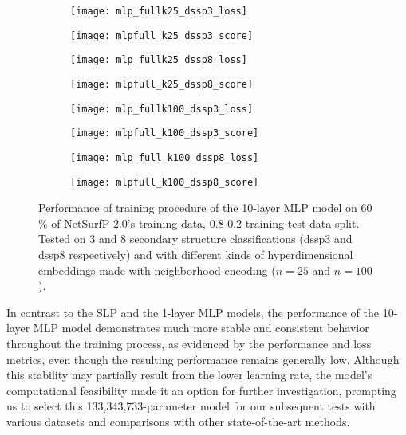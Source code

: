 \begin{figure}[htbp]
    \centering
    \begin{subfigure}{0.48\textwidth}
        \texttt{[image: mlp\_fullk25\_dssp3\_loss]}
        \label{fig:subefig}
    \end{subfigure}
    \hfill
    \begin{subfigure}{0.48\textwidth}
        \texttt{[image: mlpfull\_k25\_dssp3\_score]}
        \label{fig:subefi}
    \end{subfigure}
    
    \begin{subfigure}{0.48\textwidth}
        \texttt{[image: mlp\_fullk25\_dssp8\_loss]}
        \label{fig:subef}
    \end{subfigure}
    \hfill
    \begin{subfigure}{0.48\textwidth}
        \texttt{[image: mlpfull\_k25\_dssp8\_score]}
        \label{fig:sube}
    \end{subfigure}
    
    \begin{subfigure}{0.48\textwidth}
        \texttt{[image: mlp\_fullk100\_dssp3\_loss]}
        \label{fig:sue}
    \end{subfigure}
    \hfill
    \begin{subfigure}{0.48\textwidth}
        \texttt{[image: mlpfull\_k100\_dssp3\_score]}
        \label{fig:se}
    \end{subfigure}
    
    \begin{subfigure}{0.48\textwidth}
        \texttt{[image: mlp\_full\_k100\_dssp8\_loss]}
        \label{fig:sge}
    \end{subfigure}
    \hfill
    \begin{subfigure}{0.48\textwidth}
        \texttt{[image: mlpfull\_k100\_dssp8\_score]}
        \label{fig:she}
    \end{subfigure}
    \caption{Performance of training procedure of the 10-layer MLP model on 60 \% of NetSurfP 2.0's training data, 0.8-0.2 training-test data split. Tested on 3 and 8 secondary structure classifications (dssp3 and dssp8 respectively) and with different kinds of hyperdimensional embeddings made with neighborhood-encoding ($n = 25$ and $n=100$).}
    \label{fig:main8e}
  \end{figure}

In contrast to the SLP and the 1-layer MLP models, the performance of the 10-layer MLP model demonstrates much more stable and consistent behavior throughout the training process, as evidenced by the performance and loss metrics, even though the resulting performance remains generally low. Although this stability may partially result from the lower learning rate, the model's computational feasibility made it an option for further investigation, prompting us to select this 133,343,733-parameter model for our subsequent tests with various datasets and comparisons with other state-of-the-art methods.

